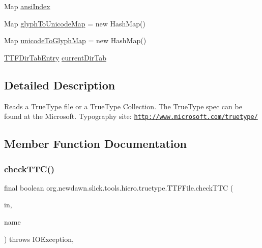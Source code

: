 \begin{DoxyCompactItemize}
Map \mbox{\hyperlink{classorg_1_1newdawn_1_1slick_1_1tools_1_1hiero_1_1truetype_1_1_t_t_f_file_a2c884e548a3215ea5c3e3c4ad32f1f73}{ansi\+Index}}
\item 
Map \mbox{\hyperlink{classorg_1_1newdawn_1_1slick_1_1tools_1_1hiero_1_1truetype_1_1_t_t_f_file_a81492de65ea7653927b7b86d885f3874}{glyph\+To\+Unicode\+Map}} = new Hash\+Map()
\item 
Map \mbox{\hyperlink{classorg_1_1newdawn_1_1slick_1_1tools_1_1hiero_1_1truetype_1_1_t_t_f_file_aed6e18e72b615365a255756b1ff20967}{unicode\+To\+Glyph\+Map}} = new Hash\+Map()
\item 
\mbox{\hyperlink{classorg_1_1newdawn_1_1slick_1_1tools_1_1hiero_1_1truetype_1_1_t_t_f_dir_tab_entry}{T\+T\+F\+Dir\+Tab\+Entry}} \mbox{\hyperlink{classorg_1_1newdawn_1_1slick_1_1tools_1_1hiero_1_1truetype_1_1_t_t_f_file_acf28b142db59983cc93fba28f230228d}{current\+Dir\+Tab}}
\end{DoxyCompactItemize}


\subsection{Detailed Description}
Reads a True\+Type file or a True\+Type Collection. The True\+Type spec can be found at the Microsoft. Typography site\+: \href{http://www.microsoft.com/truetype/}{\tt http\+://www.\+microsoft.\+com/truetype/} 

\subsection{Member Function Documentation}
\mbox{\label{classorg_1_1newdawn_1_1slick_1_1tools_1_1hiero_1_1truetype_1_1_t_t_f_file_a8854ffcced1a986071cc253031e2bcf8}} 
\subsubsection{\texorpdfstring{check\+T\+T\+C()}{checkTTC()}}
{\footnotesize\ttfamily final boolean org.\+newdawn.\+slick.\+tools.\+hiero.\+truetype.\+T\+T\+F\+File.\+check\+T\+TC (\begin{DoxyParamCaption}\item[{\mbox{\hyperlink{classorg_1_1newdawn_1_1slick_1_1tools_1_1hiero_1_1truetype_1_1_font_file_reader}{Font\+File\+Reader}}}]{in,  }\item[{String}]{name }\end{DoxyParamCaption}) throws I\+O\+Exception\hspace{0.3cm}{\ttfamily [inline]}, {\ttfamily [protected]}}

